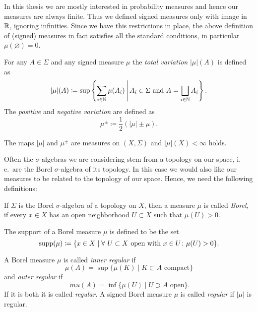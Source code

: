 \begin{rem}
  In this thesis we are mostly interested in probability measures and hence our measures are always finite. Thus we defined signed measures only with image in \(\mathbb{R}\), ignoring infinities. Since we have this restrictions in place, the above definition of (signed) measures in fact satisfies all the standard conditions, in particular \(\mu(\varnothing) = 0\).
\end{rem}

\begin{defin}
    For any \(A \in \Sigma\) and any signed measure \(\mu\) the \emph{total variation} \(|\mu|(A)\) is defined as
  \[
    |\mu|(A) \coloneqq \sup \left\{\sum_{i \in \mathbb{N}} \mu(A_i) \,\middle|\, A_i \in \Sigma \text{ and } A = \bigsqcup_{i \in \mathbb{N}} A_i \right \}.
  \]
  The \emph{positive} and \emph{negative variation} are defined as
  \[
    \mu^\pm \coloneqq \frac12 (|\mu| \pm \mu).
  \]
\end{defin}

\begin{prop}
  The maps \(|\mu|\) and \(\mu^\pm\) are measures on \((X, \Sigma)\) and \(|\mu|(X) < \infty\) holds.
\end{prop}

Often the \(\sigma\)-algebras we are considering stem from a topology on our space, i.\,e.\ are the Borel \(\sigma\)-algebra of its topology. In this case we would also like our measures to be related to the topology of our space. Hence, we need the following definitions:

\begin{defin}
  If \(\Sigma\) is the Borel \(\sigma\)-algebra of a topology on \(X\), then a measure \(\mu\) is called \emph{Borel}, if every \(x \in X\) has an open neighborhood \(U \subset X\) such that \(\mu(U) > 0\).

  The support of a Borel measure \(\mu\) is defined to be the set
  \[
    \operatorname{supp}(\mu) \coloneqq \{x \in X \mid \forall\ U \subset X \text{ open with } x \in U\colon \mu(U) > 0\}.
  \]
\end{defin}

\begin{defin}
  A Borel measure \(\mu\) is called \emph{inner regular} if
  \[
    \mu(A) = \sup \{ \mu(K) \mid K \subset A \text{ compact}\}
  \]
  and \emph{outer regular} if
  \[\
    mu(A) = \inf \{ \mu(U) \mid U \supset A \text{ open}\}.
  \]
  If it is both it is called \emph{regular}. A signed Borel measure \(\mu\) is called \emph{regular} if \(|\mu|\) is regular.
\end{defin}

